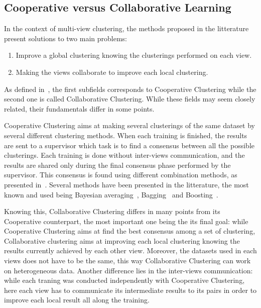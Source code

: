     \subsection{Cooperative versus Collaborative Learning}
    In the context of multi-view clustering, the methods proposed in the litterature present solutions to two main problems:

    \begin{enumerate}
        \item Improve a global clustering knowing the clusterings performed on each view.
        \item Making the views collaborate to improve each local clustering.
    \end{enumerate}

    As defined in~\cite{cornuejols2018collaborative}, the first subfields corresponds to Cooperative Clustering while the second one is called Collaborative Clustering. While these fields may seem closely related, their fundamentals differ in some points.

    Cooperative Clustering aims at making several clusterings of the same dataset by several different clustering methods. When each training is finished, the results are sent to a supervisor which task is to find a consensus between all the possible clusterings. Each training is done without inter-views communication, and the results are shared only during the final consensus phase performed by the supervisor. This consensus is found using different combination methods, as presented in~\cite{kittler1998combining,dietterich2000ensemble}. Several methods have been presented in the litterature, the most known and used being Bayesian averaging~\cite{kittler1998combining}, Bagging~\cite{breiman1996bagging} and Boosting~\cite{freund1997decision}.

    Knowing this, Collaborative Clustering differs in many points from its Cooperative counterpart, the most important one being the its final goal: while Cooperative Clustering aims at find the best consensus among a set of clustering, Collaborative clustering aims at improving each local clustering knowing the results currently achieved by each other view. Moreover, the datasets used in each views does not have to be the same, this way Collaborative Clustering can work on heterogeneous data. Another difference lies in the inter-views communication: while each traning was conducted independently with Cooperative Clustering, here each view has to communicate its intermediate results to its pairs in order to improve each local result all along the training.
    
